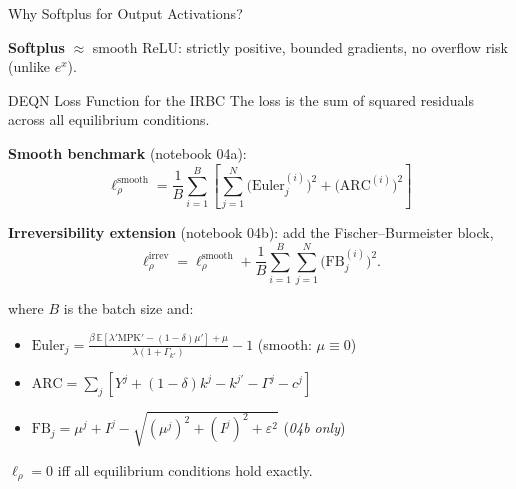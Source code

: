 \documentclass[aspectratio=169,11pt]{beamer}
\newcommand{\emphc}[1]{\textcolor{harvardcrimson}{#1}}
\newcommand{\E}[1]{\mathbb{E}\!\left[#1\right]}
\begin{document}
\begin{frame}{Why Softplus for Output Activations?}
\begin{center}
\end{center}

\vspace{0.2em}
{\small
\textbf{Softplus} $\approx$ smooth ReLU: strictly positive, bounded gradients, no overflow risk (unlike $e^x$).
}
\end{frame}

\begin{frame}{DEQN Loss Function for the IRBC}
The loss is the \emphc{sum of squared residuals} across all equilibrium conditions.

\vspace{0.3em}
\textbf{Smooth benchmark} (notebook 04a):
\[
\boxed{
\ell^{\mathrm{smooth}}_\rho = \frac{1}{B}\sum_{i=1}^{B} \left[\sum_{j=1}^{N} \bigl(\text{Euler}_j^{(i)}\bigr)^2 + \bigl(\text{ARC}^{(i)}\bigr)^2\right]
}
\]

\vspace{0.2em}
\textbf{Irreversibility extension} (notebook 04b): add the Fischer--Burmeister block,
\[
\ell^{\mathrm{irrev}}_\rho = \ell^{\mathrm{smooth}}_\rho + \frac{1}{B}\sum_{i=1}^{B}\sum_{j=1}^{N}\bigl(\text{FB}_j^{(i)}\bigr)^2.
\]

\vspace{0.2em}
where $B$ is the batch size and:
\begin{itemize}
    \item $\text{Euler}_j = \frac{\beta\,\E{\lambda' \text{MPK}' - (1-\delta)\mu'} + \mu}{\lambda(1+\Gamma_{k'})} - 1$ \quad (smooth: $\mu \equiv 0$)
    \item $\text{ARC} = \sum_j [Y^j + (1-\delta)k^j - k^{j\prime} - \Gamma^j - c^j]$
    \item $\text{FB}_j = \mu^j + I^j - \sqrt{(\mu^j)^2 + (I^j)^2 + \varepsilon^2}$ \quad (\emph{04b only})
\end{itemize}

\vspace{0.2em}
$\ell_\rho = 0$ iff all equilibrium conditions hold exactly.
\end{frame}
\end{document}
